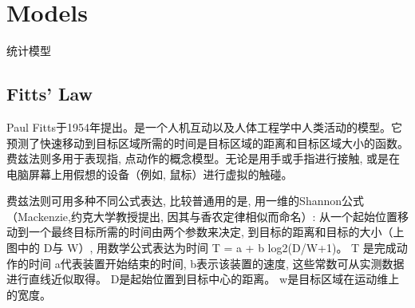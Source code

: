 \documentclass[UTF8]{../09-Mathematics}
\begin{document}
\section{Models}
统计模型
\subsection{Fitts' Law}
Paul Fitts于1954年提出。是一个人机互动以及人体工程学中人类活动的模型。它预测了快速移动到目标区域所需的时间是目标区域的距离和目标区域大小的函数。费兹法则多用于表现指, 点动作的概念模型。无论是用手或手指进行接触, 或是在电脑屏幕上用假想的设备（例如, 鼠标）进行虚拟的触碰。

费兹法则可用多种不同公式表达, 比较普通用的是, 用一维的Shannon公式（Mackenzie,约克大学教授提出, 因其与香农定律相似而命名）: 
从一个起始位置移动到一个最终目标所需的时间由两个参数来决定, 到目标的距离和目标的大小（上图中的 D与 W）, 用数学公式表达为时间 T = a + b log2(D/W+1)。
T 是完成动作的时间
a代表装置开始结束的时间, b表示该装置的速度, 这些常数可从实测数据进行直线近似取得。
D是起始位置到目标中心的距离。
w是目标区域在运动维上的宽度。
\end{document}
